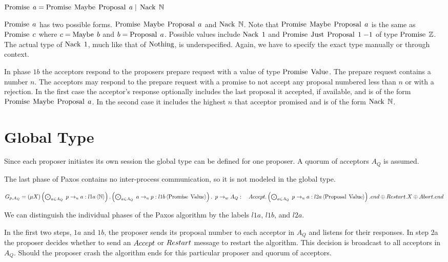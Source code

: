 $\operatorname{Promise}\; a = \operatorname{Promise}\; \operatorname{Maybe}\; \operatorname{Proposal}\; a \; | \; \operatorname{Nack}\; \mathbb{N}$

$\operatorname{Promise}\; a$ has two possible forms.
$\operatorname{Promise}\; \operatorname{Maybe}\; \operatorname{Proposal}\; a$ and $\operatorname{Nack}\; \mathbb{N}$.
Note that $\operatorname{Promise}\; \operatorname{Maybe}\; \operatorname{Proposal}\; a$ is the same as $\operatorname{Promise}\; c$ where $c = \operatorname{Maybe}\; b$ and $b = \operatorname{Proposal}\; a$.
Possible values include $\operatorname{Nack}\; 1$ and $\operatorname{Promise}\; \operatorname{Just}\; \operatorname{Proposal}\; 1\; {-1}$ of type $\operatorname{Promise}\; \mathbb{Z}$.
The actual type of $\operatorname{Nack}\; 1$, much like that of $\operatorname{Nothing}$, is underspecified.
Again, we have to specify the exact type manually or through context.

In phase $1b$ the acceptors respond to the proposers prepare request with a value of type $\operatorname{Promise}\; \operatorname{Value}$.
The prepare request contains a number $n$.
The acceptors may respond to the prepare request with a promise to not accept any proposal numbered less than $n$ or with a rejection.
In the first case the acceptor's response optionally includes the last proposal it accepted, if available, and is of the form $\operatorname{Promise}\; \operatorname{Maybe}\; \operatorname{Proposal}\; a$.
In the second case it includes the highest $n$ that acceptor promised and is of the form $\operatorname{Nack}\; \mathbb{N}$.

\section{Global Type}
Since each proposer initiates its own session the global type can be defined for one proposer.
A quorum of acceptors $A_Q$ is assumed.

The last phase of Paxos contains no inter-process communication, so it is not modeled in the global type.

$G_{p, A_Q} = \left(\mu X\right)
\left(\bigodot_{a \in A_Q}\; p \to_u a : l1a \left\langle \mathbb{N} \right\rangle\right) .
\left(\bigodot_{a \in A_Q}\; a \to_u p : l1b \left\langle \operatorname{Promise}\; \operatorname{Value} \right\rangle\right) .\\
\hspace*{0.5em}p \to_w A_Q : \\
\hspace*{1em}
\mathnormal{Accept}.\left(\bigodot_{a \in A_Q}\; p \to_u a : l2a \left\langle \operatorname{Proposal}\; \operatorname{Value} \right\rangle\right).end \oplus
\mathnormal{Restart}.X \oplus
\mathnormal{Abort}.end$

We can distinguish the individual phases of the Paxos algorithm by the labels $l1a$, $l1b$, and $l2a$.

In the first two steps, $1a$ and $1b$, the proposer sends its proposal number to each acceptor in $A_Q$ and listens for their responses.
In step 2a the proposer decides whether to send an $\mathnormal{Accept}$ or $\mathnormal{Restart}$ message to restart the algorithm.
This decision is broadcast to all acceptors in $A_Q$.
Should the proposer crash the algorithm ends for this particular proposer and quorum of acceptors.


